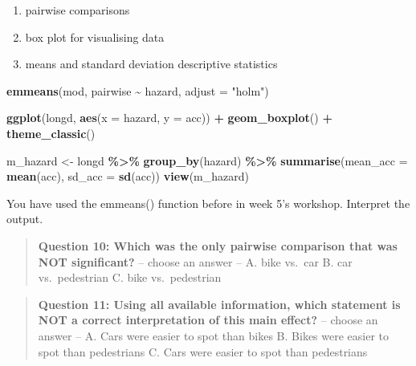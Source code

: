 \documentclass[
]{book}
\newenvironment{Shaded}{\begin{snugshade}}{\end{snugshade}}
\newcommand{\AttributeTok}[1]{\textcolor[rgb]{0.13,0.29,0.53}{#1}}
\newcommand{\FunctionTok}[1]{\textcolor[rgb]{0.13,0.29,0.53}{\textbf{#1}}}
\newcommand{\NormalTok}[1]{#1}
\newcommand{\OtherTok}[1]{\textcolor[rgb]{0.56,0.35,0.01}{#1}}
\newcommand{\SpecialCharTok}[1]{\textcolor[rgb]{0.81,0.36,0.00}{\textbf{#1}}}
\newcommand{\StringTok}[1]{\textcolor[rgb]{0.31,0.60,0.02}{#1}}
\begin{document}
\begin{enumerate}
\def\labelenumi{\arabic{enumi})}
\item
  pairwise comparisons
\item
  box plot for visualising data
\item
  means and standard deviation descriptive statistics
\end{enumerate}

\begin{Shaded}
\begin{Highlighting}[]
\FunctionTok{emmeans}\NormalTok{(mod,}
\NormalTok{        pairwise }\SpecialCharTok{\textasciitilde{}}\NormalTok{ hazard,}
        \AttributeTok{adjust =} \StringTok{"holm"}\NormalTok{)}
\end{Highlighting}
\end{Shaded}

\begin{Shaded}
\begin{Highlighting}[]
\FunctionTok{ggplot}\NormalTok{(longd, }\FunctionTok{aes}\NormalTok{(}\AttributeTok{x =}\NormalTok{ hazard, }\AttributeTok{y =}\NormalTok{ acc)) }\SpecialCharTok{+}
  \FunctionTok{geom\_boxplot}\NormalTok{() }\SpecialCharTok{+}
  \FunctionTok{theme\_classic}\NormalTok{()}
\end{Highlighting}
\end{Shaded}

\begin{Shaded}
\begin{Highlighting}[]
\NormalTok{m\_hazard }\OtherTok{\textless{}{-}}\NormalTok{ longd }\SpecialCharTok{\%\textgreater{}\%}
  \FunctionTok{group\_by}\NormalTok{(hazard) }\SpecialCharTok{\%\textgreater{}\%}
  \FunctionTok{summarise}\NormalTok{(}\AttributeTok{mean\_acc =} \FunctionTok{mean}\NormalTok{(acc),}
            \AttributeTok{sd\_acc =} \FunctionTok{sd}\NormalTok{(acc))}
\FunctionTok{view}\NormalTok{(m\_hazard)}
\end{Highlighting}
\end{Shaded}

You have used the emmeans() function before in week 5's workshop. Interpret the output.

\begin{quote}
\textbf{Question 10: Which was the only pairwise comparison that was NOT significant?} -- choose an answer -- A. bike vs.~car B. car vs.~pedestrian C. bike vs.~pedestrian
\end{quote}

\begin{quote}
\textbf{Question 11: Using all available information, which statement is NOT a correct interpretation of this main effect?} -- choose an answer -- A. Cars were easier to spot than bikes B. Bikes were easier to spot than pedestrians C. Cars were easier to spot than pedestrians
\end{quote}
\end{document}
